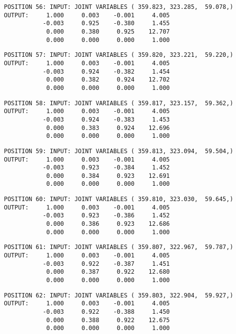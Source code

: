 \begin{verbatim}
POSITION 56: INPUT: JOINT VARIABLES ( 359.823, 323.285,  59.078,)
OUTPUT:     1.000     0.003    -0.001     4.005
           -0.003     0.925    -0.380     1.455
            0.000     0.380     0.925    12.707
            0.000     0.000     0.000     1.000
\end{verbatim} \pagebreak[1]\begin{verbatim}
POSITION 57: INPUT: JOINT VARIABLES ( 359.820, 323.221,  59.220,)
OUTPUT:     1.000     0.003    -0.001     4.005
           -0.003     0.924    -0.382     1.454
            0.000     0.382     0.924    12.702
            0.000     0.000     0.000     1.000
\end{verbatim} \pagebreak[1]\begin{verbatim}
POSITION 58: INPUT: JOINT VARIABLES ( 359.817, 323.157,  59.362,)
OUTPUT:     1.000     0.003    -0.001     4.005
           -0.003     0.924    -0.383     1.453
            0.000     0.383     0.924    12.696
            0.000     0.000     0.000     1.000
\end{verbatim} \pagebreak[1]\begin{verbatim}
POSITION 59: INPUT: JOINT VARIABLES ( 359.813, 323.094,  59.504,)
OUTPUT:     1.000     0.003    -0.001     4.005
           -0.003     0.923    -0.384     1.452
            0.000     0.384     0.923    12.691
            0.000     0.000     0.000     1.000
\end{verbatim} \pagebreak[1]\begin{verbatim}
POSITION 60: INPUT: JOINT VARIABLES ( 359.810, 323.030,  59.645,)
OUTPUT:     1.000     0.003    -0.001     4.005
           -0.003     0.923    -0.386     1.452
            0.000     0.386     0.923    12.686
            0.000     0.000     0.000     1.000
\end{verbatim} \pagebreak[1]\begin{verbatim}
POSITION 61: INPUT: JOINT VARIABLES ( 359.807, 322.967,  59.787,)
OUTPUT:     1.000     0.003    -0.001     4.005
           -0.003     0.922    -0.387     1.451
            0.000     0.387     0.922    12.680
            0.000     0.000     0.000     1.000
\end{verbatim} \pagebreak[1]\begin{verbatim}
POSITION 62: INPUT: JOINT VARIABLES ( 359.803, 322.904,  59.927,)
OUTPUT:     1.000     0.003    -0.001     4.005
           -0.003     0.922    -0.388     1.450
            0.000     0.388     0.922    12.675
            0.000     0.000     0.000     1.000
\end{verbatim} \pagebreak[1]\begin{verbatim}

\end{verbatim}
